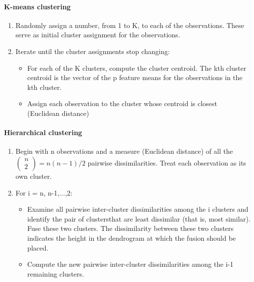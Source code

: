 \documentclass[../document.tex]{subfiles}
\begin{document}
	\paragraph{K-means clustering}
	\begin{center}
		\begin{enumerate}
			\item Randomly assign a number, from 1 to K, to each of the observations. These serve as initial cluster assignment for the observations.
			\item Iterate until the cluster assignments stop changing:
			\begin{itemize}
				\item For each of the K clusters, compute the cluster centroid. The kth cluster centroid is the vector of the p feature means for the observations in the kth cluster.
				\item Assign each observation to the cluster whose centroid is closest (Euclidean distance)
			\end{itemize}
		\end{enumerate}
	\end{center}

	\paragraph{Hierarchical clustering}
	\begin{center}
		\begin{enumerate}
			\item Begin with n observations and a measure (Euclidean distance) of all the
			\(
			\begin{pmatrix}
			n\\2
			\end{pmatrix} = n(n-1)/2
			\)
			pairwise dissimilarities. Treat each observation as its own cluster.
			\item For i = n, n-1,...,2:
			\begin{itemize}
				\item Examine all pairwise inter-cluster dissimilarities among the i clusters and identify the pair of clustersthat are least dissimilar (that is, most similar). Fuse these two clusters. The dissimilarity between these two clusters indicates the height in the dendrogram at which the fusion should be placed.
				\item Compute the new pairwise inter-cluster dissimilarities among the i-1 remaining clusters.
			\end{itemize}
		\end{enumerate}
	\end{center}
\end{document}
